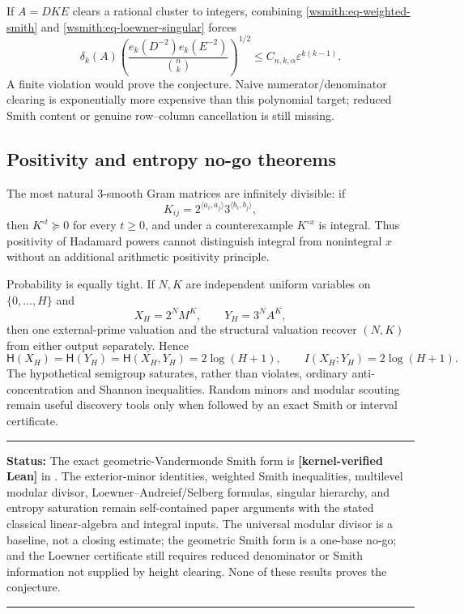 \documentclass[11pt,oneside]{article}
\theoremstyle{definition}
\theoremstyle{remark}
\newcommand{\lean}[1]{\texttt{\detokenize{#1}}}
\newcommand{\statuslean}{\textcolor{leanblue}{\textbf{[kernel-verified Lean]}}}
\newenvironment{statusbox}[1]
{\begin{center}\begin{minipage}{0.94\textwidth}\raggedright\hbadness=10000\hrule
\vspace{0.45em}\textbf{Status:} #1\par\vspace{0.35em}}
{\vspace{0.35em}\hrule\end{minipage}\end{center}}
\begin{document}
If $A=DKE$ clears a rational cluster to integers, combining
\eqref{wsmith:eq-weighted-smith} and \eqref{wsmith:eq-loewner-singular} forces
\begin{equation}
 \delta_k(A)
 \left(\frac{e_k(D^{-2})e_k(E^{-2})}{\binom nk}\right)^{1/2}
 \le C_{n,k,\alpha}\varepsilon^{k(k-1)}.
 \label{wsmith:eq-loewner-certificate}
\end{equation}
A finite violation would prove the conjecture.  Naive numerator/denominator clearing is
exponentially more expensive than this polynomial target; reduced Smith content or genuine
row--column cancellation is still missing.

\subsection{Positivity and entropy no-go theorems}
\label{wsmith:no-go}

The most natural $3$-smooth Gram matrices are infinitely divisible: if
\begin{equation}
 K_{ij}=2^{\langle a_i,a_j\rangle}3^{\langle b_i,b_j\rangle},
\end{equation}
then $K^{\circ t}\succeq0$ for every $t\ge0$, and under a counterexample
$K^{\circ x}$ is integral.  Thus positivity of Hadamard powers cannot distinguish integral
from nonintegral $x$ without an additional arithmetic positivity principle.

Probability is equally tight.  If $N,K$ are independent uniform variables on
$\{0,\ldots,H\}$ and
\begin{equation}
 X_H=2^N M^K,\qquad Y_H=3^N A^K,
\end{equation}
then one external-prime valuation and the structural valuation recover $(N,K)$ from either
output separately.  Hence
\begin{equation}
 \mathsf H(X_H)=\mathsf H(Y_H)=\mathsf H(X_H,Y_H)=2\log(H+1),
 \qquad I(X_H;Y_H)=2\log(H+1).
 \label{wsmith:eq-entropy-saturation}
\end{equation}
The hypothetical semigroup saturates, rather than violates, ordinary anti-concentration and
Shannon inequalities.  Random minors and modular scouting remain useful discovery tools only
when followed by an exact Smith or interval certificate.

\begin{statusbox}{The exact geometric-Vandermonde Smith form is \statuslean{} in
\lean{GeometricVandermondeSmith}.  The
exterior-minor identities, weighted Smith inequalities, multilevel modular divisor,
Loewner--Andreief/Selberg formulas, singular hierarchy, and entropy saturation remain
self-contained paper arguments with the stated classical linear-algebra and integral inputs.
The universal modular divisor is a baseline, not a closing estimate; the geometric Smith form
is a one-base no-go; and the Loewner certificate still requires reduced denominator or Smith
information not supplied by height clearing.  None of these results proves the conjecture.}
\end{statusbox}
\end{document}
